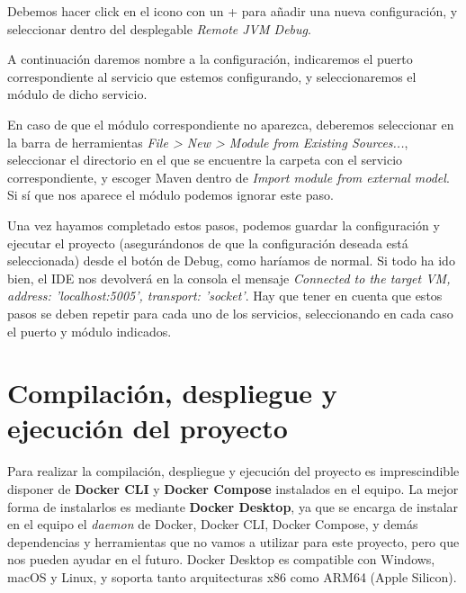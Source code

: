 Debemos hacer click en el icono con un + para añadir una nueva configuración, y seleccionar dentro del desplegable \textit{Remote JVM Debug}.


A continuación daremos nombre a la configuración, indicaremos el puerto correspondiente al servicio que estemos configurando, y seleccionaremos el módulo de dicho servicio.


En caso de que el módulo correspondiente no aparezca, deberemos seleccionar en la barra de herramientas \textit{File > New > Module from Existing Sources...}, seleccionar el directorio en el que se encuentre la carpeta con el servicio correspondiente, y escoger Maven dentro de \textit{Import module from external model}. Si sí que nos aparece el módulo podemos ignorar este paso.


Una vez hayamos completado estos pasos, podemos guardar la configuración y ejecutar el proyecto (asegurándonos de que la configuración deseada está seleccionada) desde el botón de Debug, como haríamos de normal. Si todo ha ido bien, el IDE nos devolverá en la consola el mensaje \textit{Connected to the target VM, address: 'localhost:5005', transport: 'socket'}. Hay que tener en cuenta que estos pasos se deben repetir para cada uno de los servicios, seleccionando en cada caso el puerto y módulo indicados.

\section{Compilación, despliegue y ejecución del proyecto}

Para realizar la compilación, despliegue y ejecución del proyecto es imprescindible disponer de \textbf{Docker CLI} y \textbf{Docker Compose} instalados en el equipo. La mejor forma de instalarlos es mediante \textbf{Docker Desktop}, ya que se encarga de instalar en el equipo el \textit{daemon} de Docker, Docker CLI, Docker Compose, y demás dependencias y herramientas que no vamos a utilizar para este proyecto, pero que nos pueden ayudar en el futuro. Docker Desktop es compatible con Windows, macOS y Linux, y soporta tanto arquitecturas x86 como ARM64 (Apple Silicon).

